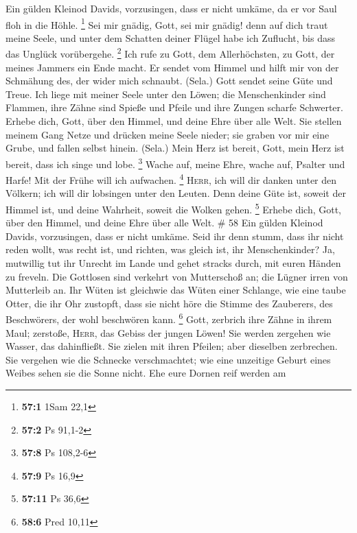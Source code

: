  Ein gülden Kleinod Davids, vorzusingen, dass er nicht
umkäme, da er vor Saul floh in die Höhle. \footnote{\textbf{57:1} 1Sam
  22,1}  Sei mir gnädig, Gott, sei mir gnädig! denn auf
dich traut meine Seele, und unter dem Schatten deiner Flügel habe ich
Zuflucht, bis dass das Unglück vorübergehe. \footnote{\textbf{57:2} Ps
  91,1-2}  Ich rufe zu Gott, dem Allerhöchsten, zu Gott,
der meines Jammers ein Ende macht.  Er sendet vom Himmel
und hilft mir von der Schmähung des, der wider mich schnaubt. (Sela.)
Gott sendet seine Güte und Treue.  Ich liege mit meiner
Seele unter den Löwen; die Menschenkinder sind Flammen, ihre Zähne sind
Spieße und Pfeile und ihre Zungen scharfe Schwerter. 
Erhebe dich, Gott, über den Himmel, und deine Ehre über alle Welt.
 Sie stellen meinem Gang Netze und drücken meine Seele
nieder; sie graben vor mir eine Grube, und fallen selbst hinein. (Sela.)
 Mein Herz ist bereit, Gott, mein Herz ist bereit, dass
ich singe und lobe. \footnote{\textbf{57:8} Ps 108,2-6} 
Wache auf, meine Ehre, wache auf, Psalter und Harfe! Mit der Frühe will
ich aufwachen. \footnote{\textbf{57:9} Ps 16,9} 
\textsc{Herr}, ich will dir danken unter den Völkern; ich will dir
lobsingen unter den Leuten.  Denn deine Güte ist, soweit
der Himmel ist, und deine Wahrheit, soweit die Wolken gehen. \footnote{\textbf{57:11}
  Ps 36,6}  Erhebe dich, Gott, über den Himmel, und deine
Ehre über alle Welt. \# 58  Ein gülden Kleinod Davids,
vorzusingen, dass er nicht umkäme.  Seid ihr denn stumm,
dass ihr nicht reden wollt, was recht ist, und richten, was gleich ist,
ihr Menschenkinder?  Ja, mutwillig tut ihr Unrecht im
Lande und gehet stracks durch, mit euren Händen zu freveln.
 Die Gottlosen sind verkehrt von Mutterschoß an; die
Lügner irren von Mutterleib an.  Ihr Wüten ist gleichwie
das Wüten einer Schlange, wie eine taube Otter, die ihr Ohr zustopft,
 dass sie nicht höre die Stimme des Zauberers, des
Beschwörers, der wohl beschwören kann. \footnote{\textbf{58:6} Pred
  10,11}  Gott, zerbrich ihre Zähne in ihrem Maul;
zerstoße, \textsc{Herr}, das Gebiss der jungen Löwen!  Sie
werden zergehen wie Wasser, das dahinfließt. Sie zielen mit ihren
Pfeilen; aber dieselben zerbrechen.  Sie vergehen wie die
Schnecke verschmachtet; wie eine unzeitige Geburt eines Weibes sehen sie
die Sonne nicht.  Ehe eure Dornen reif werden am
